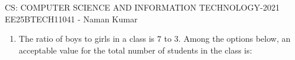 \documentclass[a4paper, 11pt]{article}
\begin{document}
\begin{center}
    \huge{CS: COMPUTER SCIENCE AND INFORMATION TECHNOLOGY-2021}\\
    \large{EE25BTECH11041 - Naman Kumar}
\end{center}

\begin{enumerate}
    \item The ratio of boys to girls in a class is $7$ to $3$.
    Among the options below, an acceptable value for the total number of students in the class is:
    \begin{enumerate}
    \end{enumerate}
    \hfill{}


\end{enumerate}
\end{document}
